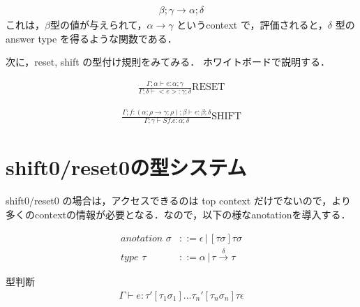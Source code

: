 \documentclass[9pt,a4paper,onecolumn]{jarticle}
\theoremstyle{definition}
\begin{document}
\begin{align}
  \beta; \gamma \to \alpha; \delta
\end{align}
これは，$\beta$型の値が与えられて，$\alpha \to \gamma$ というcontext で，評価されると，$\delta$ 型の answer type を得るような関数である．

次に，reset, shift の型付け規則をみてみる．
ホワイトボードで説明する．

\begin{align}
  \frac{\Gamma; \alpha \vdash e : \alpha; \gamma}{\Gamma; \delta \vdash <e> : \gamma; \delta} \text{RESET}
\end{align}

\begin{align}
  \frac{\Gamma; f:(\alpha; \rho \to \gamma; \rho); \beta \vdash e: \beta; \delta}{\Gamma; \gamma \vdash S f.e : \alpha; \delta} \text{SHIFT}
\end{align}

\section{shift0/reset0の型システム}
shift0/reset0 の場合は，アクセスできるのは top context だけでないので，より多くのcontextの情報が必要となる．なので，以下の様なanotationを導入する．

\begin{align}
   anotation \,\, \sigma &::= \epsilon \, |  \, [\tau \sigma] \tau \sigma \\
   type \,\, \tau &::= \alpha \, | \, \tau \overset{\delta} \to \tau
\end{align}

型判断
\begin{align}
  \Gamma \vdash e : \tau'[\tau_1 \sigma_1] ... \tau_n'[\tau_n \sigma_n] \tau \epsilon
\end{align}

\end{document}
